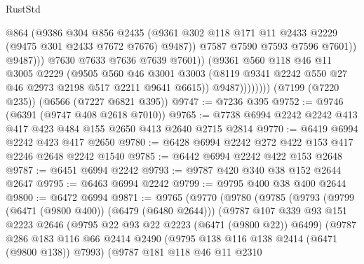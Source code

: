 \begin{lexlean}{RustStd}
\begin{coremodule}
{\begin{coremodule}
{{{{{{{{{{{{{{{{{{{{{{{{{{                                @864
                                (@9386
                                  @304
                                  @856
                                  @2435
                                  (@9361
                                    @302
                                    @118
                                    @171
                                    @11
                                    @2433
                                    @2229
                                    (@9475 @301 @2433 @7672 @7676)
                                    @9487))
                                @7587
                                @7590
                                @7593
                                @7596
                                @7601))
                            @9487)))
                      @7630
                      @7633
                      @7636
                      @7639
                      @7601))
                  (@9361
                    @560
                    @118
                    @46
                    @11
                    @3005
                    @2229
                    (@9505
                      @560
                      @46
                      @3001
                      @3003
                      (@8119 @9341 @2242 @550 @27 @46 @2973 @2198 @517 @2211 @9641 @6615))
                    @9487))))))))
    (@7199 (@7220 @235))
    (@6566 (@7227 @6821 @395))
@9747 := @7236 @395
@9752 := @9746 (@6391 (@9747 @408 @2618 @7010))
@9765 := @7738 @6994 @2242 @2242 @413 @417 @423 @484 @155 @2650 @413 @2640 @2715 @2814
@9770 := @6419 @6994 @2242 @423 @417 @2650
@9780 := @6428 @6994 @2242 @272 @422 @153 @417 @2246 @2648 @2242 @1540
@9785 := @6442 @6994 @2242 @422 @153 @2648
@9787 := @6451 @6994 @2242
@9793 := @9787 @420 @340 @38 @152 @2644 @2647
@9795 := @6463 @6994 @2242
@9799 := @9795 @400 @38 @400 @2644
@9800 := @6472 @6994
@9871 := @9765
    (@9770
      (@9780
        (@9785
          (@9793
            (@9799 (@6471 (@9800 @400)) (@6479 (@6480 @2644)))
            (@9787
              @107
              @339
              @93
              @151
              @2223
              @2646
              (@9795 @22 @93 @22 @2223 (@6471 (@9800 @22)) @6499)
              (@9787
                @286
                @183
                @116
                @66
                @2414
                @2490
                (@9795 @138 @116 @138 @2414 (@6471 (@9800 @138)) @7993)
                (@9787
                  @181
                  @118
                  @46
                  @11
                  @2310
}}}}}}}}}}}}}}}}}}}}}}}}}}
\end{coremodule}}
\end{coremodule}
\end{lexlean}
